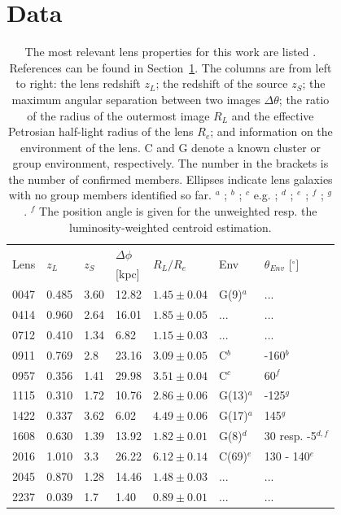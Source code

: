 \documentclass[useAMS,usenatbib]{mn2e}
\begin{document}
\section{Data}\label{sec:data}
\setlength\tabcolsep{4pt}
\begin{table}
  \begin{center}
    \begin{tabular}{l l l l l l l}
      \multirow{2}{*}{Lens} & \multirow{2}{*}{$z_{L}$} & \multirow{2}{*}{$z_{S}$} & $\Delta\phi$ & \multirow{2}{*}{$R_{L}/R_{e}$} & \multirow{2}{*}{Env} & \multirow{2}{*}{$\theta_{Env}$ [$^{\circ}$]} \\ 
       & & & [kpc] & & & \\ \hline
      0047 & 0.485 & 3.60 & 12.82 & $1.45\pm0.04$ & G(9)$^{a}$ & ... \\
      0414 & 0.960 & 2.64 & 16.01 & $1.85\pm0.05$ & ... & ... \\
      0712 & 0.410 & 1.34 & 6.82  & $1.15\pm0.03$ & ... & ... \\
      0911 & 0.769 & 2.8  & 23.16 & $3.09\pm0.05$ & C$^{b}$ & -160$^{b}$ \\
      0957 & 0.356 & 1.41 & 29.98 & $3.51\pm0.04$ & C$^{c}$ & 60$^{f}$ \\
      1115 & 0.310 & 1.72 & 10.76 & $2.86\pm0.06$ & G(13)$^{a}$ & -125$^{g}$ \\
      1422 & 0.337 & 3.62 & 6.02  & $4.49\pm0.06$ & G(17)$^{a}$ & 145$^{g}$ \\
      1608 & 0.630 & 1.39 & 13.92 & $1.82\pm0.01$ & G(8)$^{d}$ & 30 resp. -5$^{d,f}$\\
      2016 & 1.010 & 3.3  & 26.22 & $6.12\pm0.14$ & C(69)$^{e}$ & 130 - 140$^{e}$ \\
      2045 & 0.870 & 1.28 & 14.46 & $1.48\pm0.03$ & ... & ... \\
      2237 & 0.039 & 1.7  & 1.40  & $0.89\pm0.01$ & ... & ... \\
    \end{tabular}
    \caption[width=\linewidth]{The most relevant lens properties for this work are listed \citep[for an expanded version of this table see][]{2011ApJ...740...97L}. References can be found in Section~\ref{sec:data}. The columns are from left to right: the lens redshift $z_L$; the redshift of the source $z_S$; the maximum angular separation between two images $\Delta\theta$; the ratio of the radius of the outermost image $R_L$ and the effective Petrosian half-light radius of the lens $R_e$; and information on the environment of the lens. C and G denote a known cluster or group environment, respectively. The number in the brackets is the number of confirmed members. Ellipses indicate lens galaxies with no group members identified so far. \newline $^{a}$ \citet{2011ApJ...726...84W}; $^{b}$ \citet{2001ApJ...555....1M}; $^{c}$ e.g. \citet{1992MNRAS.254P..27G}; $^{d}$ \citet{2006ApJ...642...30F}; $^{e}$ \citet{2003MNRAS.344..337T}; $^{f}$ \citet{2002ApJ...565...96C}; $^{g}$ \citet{2004ApJ...610..686G}. \newline $^{f}$ The position angle is given for the unweighted resp. the luminosity-weighted centroid estimation.}

\end{center}
\end{table}
\end{document}
